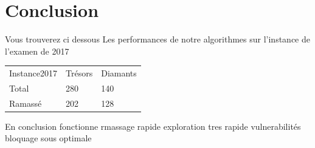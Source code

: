 \documentclass[10pt]{article}
\newcommand\tab[1][0.65cm]{\hspace*{#1}}
\begin{document}
\section{Conclusion}
\tab Vous trouverez ci dessous Les performances de notre algorithmes sur l'instance de l'examen de 2017\\
\begin{center}
\begin{tabular}{lll}
   Instance2017 & Trésors & Diamants \\
   Total & 280 & 140\\
   Ramassé & 202 & 128 \\
\end{tabular}
\end{center}
\tab
En conclusion 
fonctionne 
rmassage rapide 
exploration tres rapide 
vulnerabilités 
bloquage
sous optimale 



	
\end{document}
